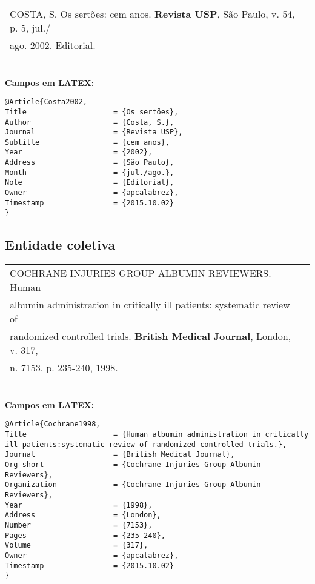 \begin{tabular}{|l|c|} \hline
	COSTA, S. Os sertões: cem anos. \textbf{Revista USP}, São Paulo, v. 54, p. 5, jul./\\ago. 2002. Editorial.\\\hline
\end{tabular} \\

\textbf{Campos em LATEX:} 

\begin{verbatim}
@Article{Costa2002,
Title                    = {Os sertões},
Author                   = {Costa, S.},
Journal                  = {Revista USP},
Subtitle                 = {cem anos},
Year                     = {2002},
Address                  = {São Paulo},
Month                    = {jul./ago.},
Note                     = {Editorial},
Owner                    = {apcalabrez},
Timestamp                = {2015.10.02}
}
\end{verbatim}

\subsection{Entidade coletiva}

\begin{tabular}{|l|c|} \hline
	COCHRANE INJURIES GROUP ALBUMIN REVIEWERS. Human \\albumin administration in critically ill patients: systematic review of \\randomized controlled trials. \textbf{British Medical} \textbf{Journal}, London, v. 317, \\n. 7153, p. 235-240, 1998. 
	\\\hline
\end{tabular} \\

\textbf{Campos em LATEX:} 

\begin{verbatim}
@Article{Cochrane1998,
Title                    = {Human albumin administration in critically 
ill patients:systematic review of randomized controlled trials.},
Journal                  = {British Medical Journal},
Org-short                = {Cochrane Injuries Group Albumin Reviewers},
Organization             = {Cochrane Injuries Group Albumin Reviewers},
Year                     = {1998},
Address                  = {London},
Number                   = {7153},
Pages                    = {235-240},
Volume                   = {317},
Owner                    = {apcalabrez},
Timestamp                = {2015.10.02}
}
\end{verbatim}

